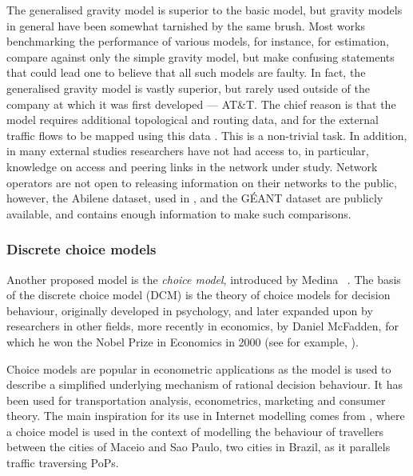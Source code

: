 The generalised gravity model is superior to the basic model, but
gravity models in general have been somewhat tarnished by the same
brush. Most works benchmarking the performance of various models, for
instance, for estimation, compare against only the simple gravity
model, but make confusing statements that could lead one to believe
that all such models are faulty. In fact, the generalised gravity
model is vastly superior, but rarely used outside of the company at
which it was first developed --- AT\&T.  The chief reason is that the
model requires additional topological and routing data, and for the
external traffic flows to be mapped using this data \cite{Zhang05InfoTh}. This is a
non-trivial task. In addition, in many external studies researchers
have not had access to, in particular, knowledge on access and
peering links in the network under study. Network operators
are not open to releasing information on their networks to the
public, however, the Abilene dataset, used in \cite{Zhang05InfoTh},
and the G\'EANT dataset \cite{GEANT} are
publicly available, and contains enough information to make such
comparisons. 
 


\subsubsection{Discrete choice models}

Another proposed model is the \textit{choice model}, introduced by
Medina \etal~\cite{Medina02TMdirections}. The basis of the discrete
choice model (DCM) is the theory of choice models for decision
behaviour, originally developed in psychology, and later expanded upon
by researchers in other fields, more recently in economics, by Daniel
McFadden, for which he won the Nobel Prize in Economics in 2000 (see
for example, \cite{McFadden78Choice}).

Choice models are popular in econometric applications as the model is
used to describe a simplified underlying mechanism of rational
decision behaviour. It has been used for transportation analysis,
econometrics, marketing and consumer theory. The main inspiration for
its use in Internet modelling comes from \cite{Swait59Choice}, where a
choice model is used in the context of modelling the behaviour of
travellers between the cities of Maceio and Sao Paulo, two cities in
Brazil, as it parallels traffic traversing PoPs.

